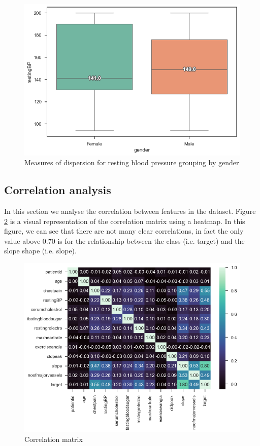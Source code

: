 \begin{figure}
    \caption{Measures of dispersion for resting blood pressure grouping by gender}\label{boxplot-bp-gender}
    \centering
    \includegraphics[width=\linewidth]{media/boxplot-08-gender-bp.png}
\end{figure}


\subsection{Correlation analysis}

In this section we analyse the correlation between features in the dataset. Figure \ref{correlation-matrix}
is a visual representation of the correlation matrix using a heatmap. In this figure, we can see that there
are not many clear correlations, in fact the only value above 0.70 is for the relationship between the class
(i.e. target) and the slope shape (i.e. slope).

\begin{figure}
    \caption{Correlation matrix}\label{correlation-matrix}
    \centering
    \includegraphics[width=\linewidth]{media/correlation-matrix.png}
\end{figure}

